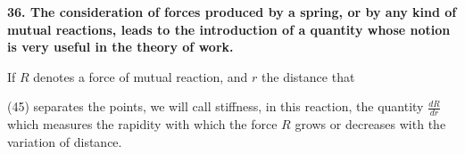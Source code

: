 \documentclass{book}
\begin{document}
\vspace{4mm}
\textbf{36. The consideration of forces produced by a spring, or by any kind of mutual reactions, leads to the introduction of a quantity whose notion is very useful in the theory of work.}
\vspace{4mm} 



If \( R \) denotes a force of mutual reaction, and \( r \) the distance that
\newpage

(45)
separates the points, we will call stiffness, in this reaction, the quantity \( \frac{dR}{dr} \) which measures the rapidity with which the force \( R \) grows or decreases with the variation of distance.






\backmatter
{}
\end{document}
